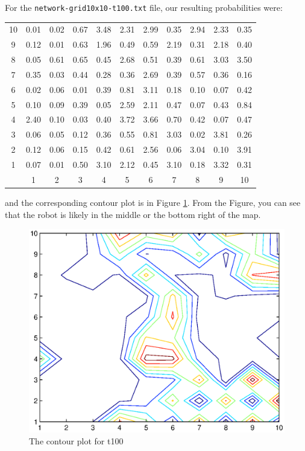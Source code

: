 \documentclass[11pt,a4paper]{article}
\begin{document}
\begin{enumerate}
		For the {\tt network-grid10x10-t100.txt} file, our resulting probabilities were:
		\begin{center}
			\begin{tabular}{|c|cccccccccc|}
				\hline
				10 & 0.01 & 0.02 & 0.67 & 3.48 & 2.31 & 2.99 & 0.35 & 2.94 & 2.33 & 0.35 \\
				9 & 0.12 & 0.01 & 0.63 & 1.96 & 0.49 & 0.59 & 2.19 & 0.31 & 2.18 & 0.40 \\
				8 & 0.05 & 0.61 & 0.65 & 0.45 & 2.68 & 0.51 & 0.39 & 0.61 & 3.03 & 3.50 \\
				7 & 0.35 & 0.03 & 0.44 & 0.28 & 0.36 & 2.69 & 0.39 & 0.57 & 0.36 & 0.16 \\
				6 & 0.02 & 0.06 & 0.01 & 0.39 & 0.81 & 3.11 & 0.18 & 0.10 & 0.07 & 0.42 \\
				5 & 0.10 & 0.09 & 0.39 & 0.05 & 2.59 & 2.11 & 0.47 & 0.07 & 0.43 & 0.84 \\
				4 & 2.40 & 0.10 & 0.03 & 0.40 & 3.72 & 3.66 & 0.70 & 0.42 & 0.07 & 0.47 \\
				3 & 0.06 & 0.05 & 0.12 & 0.36 & 0.55 & 0.81 & 3.03 & 0.02 & 3.81 & 0.26 \\
				2 & 0.12 & 0.06 & 0.15 & 0.42 & 0.61 & 2.56 & 0.06 & 3.04 & 0.10 & 3.91 \\
				1 & 0.07 & 0.01 & 0.50 & 3.10 & 2.12 & 0.45 & 3.10 & 0.18 & 3.32 & 0.31 \\
				\hline
				& 1 & 2 & 3 & 4 & 5 & 6 & 7 & 8 & 9 & 10 \\
				\hline
			\end{tabular}
		\end{center}
		and the corresponding contour plot is in Figure \ref{contour100}. From the Figure,
		you can see that the robot is likely in the middle or the bottom right of the map.
		\begin{figure}[h]
			\label{contour100}
			\begin{center}
				\includegraphics[scale=.75]{t100-contour.eps}
			\end{center}
			\caption{The contour plot for t100}
		\end{figure}
		

\end{enumerate}
\end{document}
